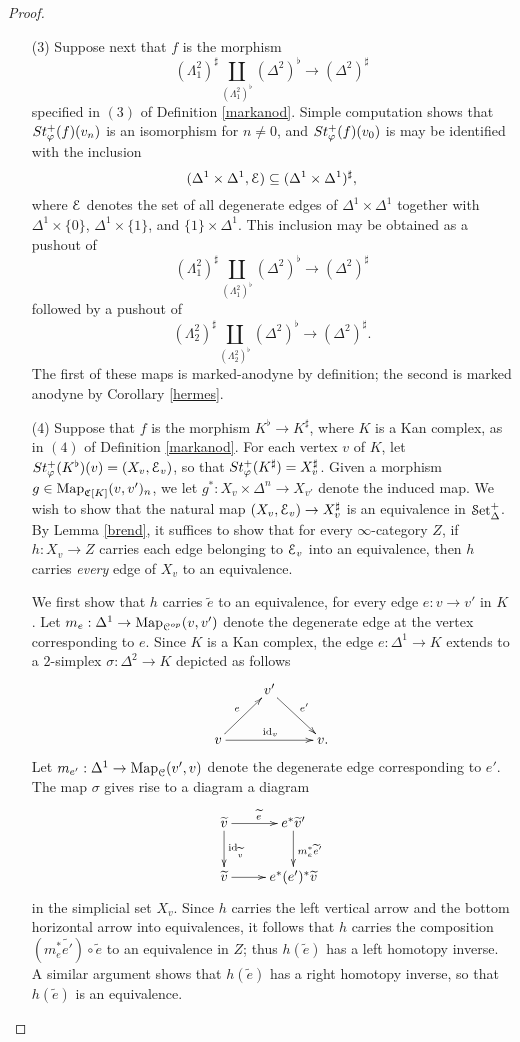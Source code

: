 \begin{proof}
\begin{itemize}
\item[(3)]
Suppose next that $f$ is the morphism $$ (\Lambda^2_1)^{\sharp} \coprod_{ (\Lambda^2_1)^{\flat} } (\Delta^2)^{\flat} \rightarrow (\Delta^2)^{\sharp}$$
specified in $(3)$ of Definition \ref{markanod}. Simple computation shows that
$St^{+}_{\varphi}(f)(v_n)$ is an isomorphism for $n \neq 0$, and $St^{+}_{\varphi}(f)(v_0)$ is may be identified with the inclusion $$(\Delta^1 \times \Delta^1, \operatorname{\mathcal{E}}) \subseteq (\Delta^1 \times \Delta^1)^{\sharp},$$ where $\operatorname{\mathcal{E}}$ denotes the set of all degenerate edges of $\Delta^1 \times \Delta^1$ together with
$\Delta^1 \times \{0\}$, $\Delta^1 \times \{1\}$, and $\{1\} \times \Delta^1$. This inclusion may be obtained as a pushout of  $$(\Lambda^2_1)^{\sharp} \coprod_{ (\Lambda^2_1)^{\flat} } (\Delta^2)^{\flat} \rightarrow (\Delta^2)^{\sharp}$$ followed by a pushout of
 $$ (\Lambda^2_2)^{\sharp} \coprod_{ (\Lambda^2_2)^{\flat} } (\Delta^2)^{\flat} \rightarrow (\Delta^2)^{\sharp}.$$ The first of these maps is marked-anodyne by definition; the second is marked anodyne by Corollary \ref{hermes}.

\item[(4)] 
Suppose that $f$ is the morphism $K^{\flat} \rightarrow K^{\sharp}$, where $K$ is a Kan complex, as in $(4)$ of Definition \ref{markanod}. For each vertex $v$ of $K$, let $St^{+}_{\varphi}(K^{\flat})(v)=(X_v, \operatorname{\mathcal{E}}_v)$, so that $St^{+}_{\varphi}(K^{\sharp})= X_v^{\sharp}$. Given a morphism $g \in \operatorname{{Map}}_{ \operatorname{\mathfrak{C}}[K]}(v,v')_n$, we let $g^{\ast}: X_v \times \Delta^n \rightarrow X_{v'}$ denote the induced map. We wish to show that the natural map $(X_v, \operatorname{\mathcal{E}}_v) \rightarrow X_{v}^{\sharp}$ is an equivalence in $\operatorname{\mathcal{S}et_{\Delta}^{+}}$. 
By Lemma \ref{brend}, it suffices to show that for every $\infty$-category $Z$, if $h: X_v \rightarrow Z$
carries each edge belonging to $\operatorname{\mathcal{E}}_{v}$ into an equivalence, then $h$ carries {\em every} edge of $X_v$ to an equivalence. 

We first show that $h$ carries $\widetilde{e}$ to an equivalence, for every edge
$e: v \rightarrow v'$ in $K$. Let $m_{e}: \Delta^1 \rightarrow \operatorname{{Map}}_{\operatorname{\mathcal{C}}^{op}}(v,v')$ denote the degenerate edge at the vertex corresponding to $e$.
Since $K$ is a Kan complex, the edge $e: \Delta^1 \rightarrow K$
extends to a $2$-simplex $\sigma: \Delta^2 \rightarrow K$ depicted as follows
$$ \xymatrix{ & v' \ar[dr]^{e'} & \\
v \ar[ur]^{e} \ar[rr]^{\id_{v}} & & v. }$$ 
Let $m_{e'}: \Delta^1 \rightarrow \operatorname{{Map}}_{\operatorname{\mathcal{C}}}(v',v)$ denote the degenerate edge corresponding to $e'$. The map $\sigma$ gives rise to a diagram a diagram
$$ \xymatrix{ \widetilde{v} \ar[r]^{ \widetilde{e} } \ar[d]^{\id_{\widetilde{v}}} & e^{\ast} \widetilde{v}' \ar[d]^{ m_e^{\ast} \widetilde{e}' } \\
\widetilde{v} \ar[r] & e^{\ast} (e')^{\ast} \widetilde{v} }$$
in the simplicial set $X_{v}$. Since $h$ carries the left vertical arrow and the bottom horizontal arrow into equivalences, it follows that $h$ carries the composition
$(m_e^{\ast} \widetilde{e'}) \circ \widetilde{e}$ to an equivalence in $Z$; thus
$h(\widetilde{e})$ has a left homotopy inverse. A similar argument shows that $h(\widetilde{e})$ has a right homotopy inverse, so that $h(\widetilde{e})$ is an equivalence.


\end{itemize}
\end{proof}
